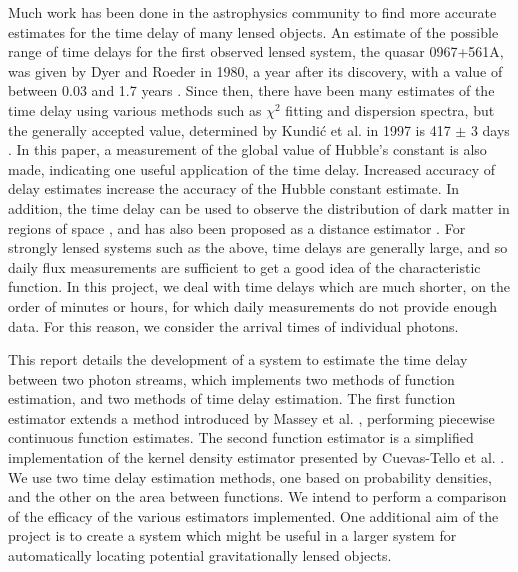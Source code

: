 \documentclass[a4paper,11pt,twoside]{article}
\begin{document}
  Much work has been done in the astrophysics community to find more accurate
  estimates for the time delay of many lensed objects. An estimate of the
  possible range of time delays for the first observed lensed system, the quasar
  0967+561A, was given by Dyer and Roeder in 1980, a year after its discovery,
  with a value of between 0.03 and 1.7 years \cite{dyer1980range}. Since then,
  there have been many estimates of the time delay using various methods such as
  $\chi$$^2$ fitting and dispersion spectra, but the generally accepted value,
  determined by Kundi\'c et al. in 1997 is 417 $\pm$ 3 days
  \cite{kundic1997robust}. In this paper, a measurement of the global value of
  Hubble's constant is also made, indicating one useful application of the time
  delay. Increased accuracy of delay estimates increase the accuracy of the
  Hubble constant estimate. In addition, the time delay can be used to observe
  the distribution of dark matter in regions of space
  \cite{schneider2006gravitational}, and has also been proposed as a distance
  estimator \cite{bozza2004time}. For strongly lensed systems such as the above,
  time delays are generally large, and so daily flux measurements are sufficient
  to get a good idea of the characteristic function. In this project, we deal
  with time delays which are much shorter, on the order of minutes or hours, for
  which daily measurements do not provide enough data. For this reason, we
  consider the arrival times of individual photons.

  This report details the development of a system to estimate the time delay
  between two photon streams, which implements two methods of function
  estimation, and two methods of time delay estimation. The first function
  estimator extends a method introduced by Massey et
  al. \cite{massey1996estimating}, performing piecewise continuous function
  estimates. The second function estimator is a simplified implementation of the
  kernel density estimator presented by Cuevas-Tello et
  al. \cite{cuevas2006accurate}. We use two time delay estimation methods, one
  based on probability densities, and the other on the area between
  functions. We intend to perform a comparison of the efficacy of the various
  estimators implemented. One additional aim of the project is to create a
  system which might be useful in a larger system for automatically locating
  potential gravitationally lensed objects.
\end{document}
